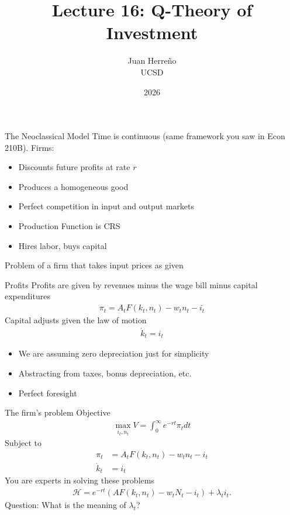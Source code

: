 \documentclass[11pt,aspectratio=169,xcolor={dvipsnames},hyperref={pdftex,pdfpagemode=UseNone,hidelinks,pdfdisplaydoctitle=true},usepdftitle=false]{beamer}
\title{Lecture 16: Q-Theory of Investment}
\author{Juan Herre\~{n}o\\UCSD}
\date{2026}
\begin{document}
\maketitle


\begin{frame}{The Neoclassical Model}
Time is continuous (same framework you saw in Econ 210B). Firms:
\pause
\begin{itemize}
\item Discounts future profits at rate $r$
\pause
\item Produces a homogeneous good
\pause
\item Perfect competition in input and output markets
\pause
\item Production Function is CRS
\pause
\item Hires labor, buys capital
\end{itemize}
Problem of a firm that takes input prices as given
\end{frame}

\begin{frame}{Profits}
Profits are given by revenues minus the wage bill minus capital expenditures
\pause
\begin{align}
\pi_{t} = A_t F(k_t,n_t) - w_t n_t - i_t
\end{align}
\pause
Capital adjusts given the law of motion
\pause
\begin{align}
\dot{k}_t = i_t
\end{align}
\pause
\begin{itemize}
\item We are assuming zero depreciation just for simplicity
\pause
\item Abstracting from taxes, bonus depreciation, etc.
\pause
\item Perfect foresight
\end{itemize}
\end{frame}

\begin{frame}{The firm's problem}
Objective
\pause
\begin{align}
\max_{i_t, n_t} V = \int_0^{\infty} e^{-rt} \pi_t dt
\end{align}
\pause
Subject to
\pause
\begin{align}
\pi_{t} &= A_t F(k_t,n_t) - w_t n_t - i_t\\
\dot{k}_t& = i_t
\end{align}
\pause
You are experts in solving these problems
\pause
\begin{align}
\mathcal{H} = e^{-rt} \left(A F(k_t,n_t) - w_t N_t -  i_t \right) + \lambda_t i_t.
\end{align}
\pause
Question: What is the meaning of $\lambda_t$?
\end{frame}
\end{document}
